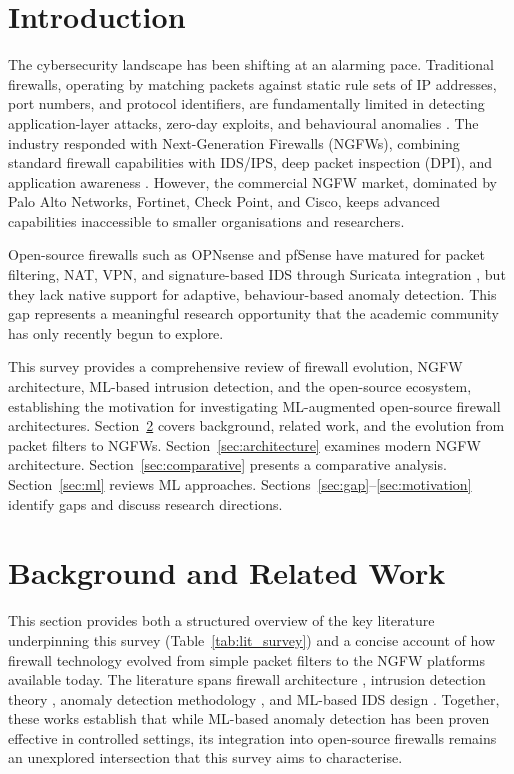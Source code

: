 \documentclass[conference]{IEEEtran}
\begin{document}
\section{Introduction}
\label{sec:intro}

The cybersecurity landscape has been shifting at an alarming pace. Traditional firewalls, operating by matching packets against static rule sets of IP addresses, port numbers, and protocol identifiers, are fundamentally limited in detecting application-layer attacks, zero-day exploits, and behavioural anomalies \cite{neupane2018ngfw, liang2022evolution}. The industry responded with Next-Generation Firewalls (NGFWs), combining standard firewall capabilities with IDS/IPS, deep packet inspection (DPI), and application awareness \cite{heino2022endpoint}. However, the commercial NGFW market, dominated by Palo Alto Networks, Fortinet, Check Point, and Cisco, keeps advanced capabilities inaccessible to smaller organisations and researchers.

Open-source firewalls such as OPNsense and pfSense have matured for packet filtering, NAT, VPN, and signature-based IDS through Suricata integration \cite{kiratsata2022behaviour}, but they lack native support for adaptive, behaviour-based anomaly detection. This gap represents a meaningful research opportunity that the academic community has only recently begun to explore.

This survey provides a comprehensive review of firewall evolution, NGFW architecture, ML-based intrusion detection, and the open-source ecosystem, establishing the motivation for investigating ML-augmented open-source firewall architectures. Section~\ref{sec:background} covers background, related work, and the evolution from packet filters to NGFWs. Section~\ref{sec:architecture} examines modern NGFW architecture. Section~\ref{sec:comparative} presents a comparative analysis. Section~\ref{sec:ml} reviews ML approaches. Sections~\ref{sec:gap}--\ref{sec:motivation} identify gaps and discuss research directions.

\section{Background and Related Work}
\label{sec:background}

This section provides both a structured overview of the key literature underpinning this survey (Table~\ref{tab:lit_survey}) and a concise account of how firewall technology evolved from simple packet filters to the NGFW platforms available today. The literature spans firewall architecture \cite{neupane2018ngfw, liang2022evolution, scarfone2009nist}, intrusion detection theory \cite{denning1987ids, khraisat2019ids}, anomaly detection methodology \cite{chandola2009anomaly, liu2008isolation, tao2018parallel}, and ML-based IDS design \cite{ahmad2021nids, dini2023overview}. Together, these works establish that while ML-based anomaly detection has been proven effective in controlled settings, its integration into open-source firewalls remains an unexplored intersection that this survey aims to characterise.
\end{document}

